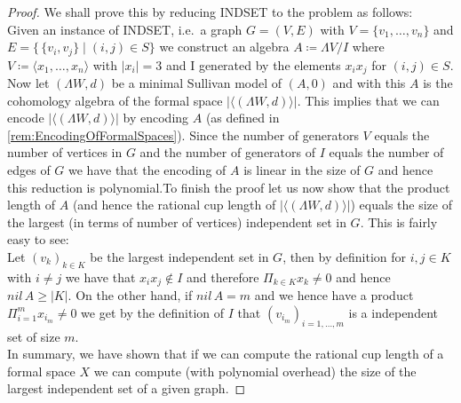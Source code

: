 \begin{proof}
 We shall prove this by reducing  INDSET to the problem  as follows: \\
 Given an instance of INDSET, i.e.\ a graph $G = (V,E)$ with $V = \lbrace v_1 , \ldots , v_n \rbrace$ and 
 $E = \lbrace \, \lbrace v_i, v_j \rbrace \; | \; (i,j) \in S \rbrace$ we construct an algebra 
 $A \coloneqq \Lambda V /I$ where $V \coloneqq \langle x_1, \ldots , x_n \rangle$ with $|x_i| = 3$ and I generated by
 the elements $x_i x_j$ for $(i,j) \in S$. Now let $(\Lambda W,d)$ be a minimal Sullivan model of $(A,0)$ and with this
 $A$ is  the cohomology algebra of the formal space $ | \langle (\Lambda W,d) \rangle | $. This implies that 
 we can encode $| \langle (\Lambda W,d) \rangle |$ by encoding $A$ (as defined in \ref{rem:EncodingOfFormalSpaces}).
 Since the number of generators $V$ equals the number of vertices in $G$ and the number of generators of $I$ equals
 the number of edges of $G$ we have that the encoding of $A$ is linear in the size of $G$ and hence this reduction
 is polynomial.To finish the proof let us now show that the product length of $A$ (and hence the rational cup length of 
 $| \langle (\Lambda W,d) \rangle | $) equals the size of the largest (in terms of number of vertices)
 independent set in $G$. This is fairly easy to see: \\
 Let $(v_k)_{k \in K}$ be the largest independent set in $G$, then by definition for $i,j \in K$ with  $i\neq j$ we have
 that $x_i x_j \notin I$ and therefore $\Pi_{k \in K} x_k \neq 0$ and hence $nil \, A \geq |K|$. On the other hand,
 if $nil \, A = m$ and we hence have a product  $\Pi_{i = 1}^m x_{i_m} \neq 0$ we get by the definition of $I$ that 
 $(v_{i_m})_{i = 1, \ldots, m}$ is a independent set of size $m$. \\In summary, we have shown that if we can compute
 the rational cup length of a formal space $X$ we can compute (with polynomial overhead) the size of the largest
 independent set of a given graph.
 
\end{proof}
